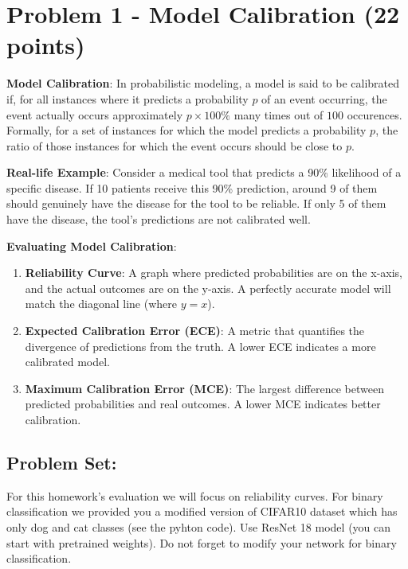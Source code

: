 \documentclass[11pt, oneside]{article}   	%
\begin{document}
\clearpage



\section*{Problem 1 - Model Calibration (22 points)}


 

\textbf{Model Calibration}: In probabilistic modeling, a model is said to be calibrated if, for all instances where it predicts a probability $p$ of an event occurring, the event actually occurs approximately $p \times100\% $ many times out of $100$ occurences. Formally, for a set of instances for which the model predicts a probability $p$, the ratio of those instances for which the event occurs should be close to $p$.

\textbf{Real-life Example}: Consider a medical tool that predicts a 90\% likelihood of a specific disease. If 10 patients receive this 90\% prediction, around 9 of them should genuinely have the disease for the tool to be reliable. If only 5 of them have the disease, the tool's predictions are not calibrated well.

\textbf{Evaluating Model Calibration}:
\begin{enumerate}
    \item \textbf{Reliability Curve}: A graph where predicted probabilities are on the x-axis, and the actual outcomes are on the y-axis. A perfectly accurate model will match the diagonal line (where \(y = x\)).
    \item \textbf{Expected Calibration Error (ECE)}: A metric that quantifies the divergence of predictions from the truth. A lower ECE indicates a more calibrated model.
    \item \textbf{Maximum Calibration Error (MCE)}: The largest difference between predicted probabilities and real outcomes. A lower MCE indicates better calibration.
\end{enumerate}

\subsection*{Problem Set:}
For this homework's evaluation we will focus on reliability curves. For binary classification we provided you a modified version of CIFAR10 dataset which has only dog and cat classes (see the pyhton code). Use ResNet 18 model (you can start with pretrained weights). Do not forget to modify your network for binary classification.
\end{document}
